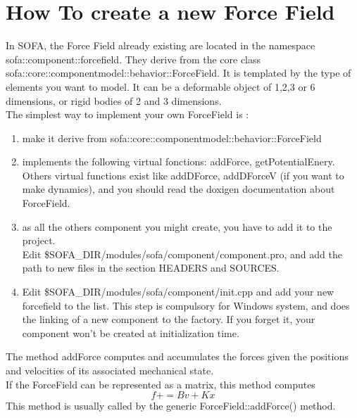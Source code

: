 
\section{How To create a new Force Field}

In SOFA, the Force Field already existing are located in the namespace sofa::component::forcefield. They derive from the core class sofa::core::componentmodel::behavior::ForceField. It is templated by the type of elements you want to model. It can be a deformable object of 1,2,3 or 6 dimensions, or rigid bodies of 2 and 3 dimensions.\\
The simplest way to implement your own ForceField is :
\begin{enumerate}
 \item make it derive from sofa::core::componentmodel::behavior::ForceField
 \item implements the following virtual fonctions: addForce, getPotentialEnery. Others virtual functions exist like  addDForce, addDForceV (if you want to make dynamics), and you should read the doxigen documentation about ForceField. 
 \item as all the others component you might create, you have to add it to the project. \\Edit \$SOFA\_DIR/modules/sofa/component/component.pro, and add the path to new files in the section HEADERS and SOURCES.
 \item Edit \$SOFA\_DIR/modules/sofa/component/init.cpp and add your new forcefield to the list. This step is compulsory for Windows system, and does the linking of a new component to the factory. If you forget it, your component won't be created at initialization time.
\end{enumerate}

The method addForce computes and accumulates the forces given the positions and velocities of its associated mechanical state.\\
If the ForceField can be represented as a matrix, this method computes
    $$ f += B v + K x $$
     This method is usually called by the generic ForceField::addForce() method.
